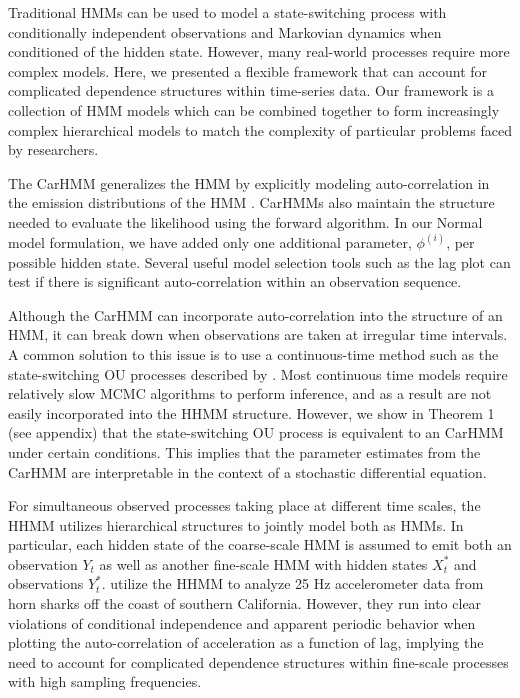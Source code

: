 

Traditional HMMs can be used to model a state-switching process with conditionally independent observations and Markovian dynamics when conditioned of the hidden state. However, many real-world processes require more complex models. Here, we presented a flexible framework that can account for complicated dependence structures within time-series data. Our framework is a collection of HMM models which can be combined together to form increasingly complex hierarchical models to match the complexity of particular problems faced by researchers.

The CarHMM generalizes the HMM by explicitly modeling auto-correlation in the emission distributions of the HMM \citep{Lawler:2019}. CarHMMs also maintain the structure needed to evaluate the likelihood using the forward algorithm. In our Normal model formulation, we have added only one additional parameter, $\phi^{(i)}$, per possible hidden state. Several useful model selection tools such as the lag plot can test if there is significant auto-correlation within an observation sequence.

Although the CarHMM can incorporate auto-correlation into the structure of an HMM, it can break down when observations are taken at irregular time intervals. A common solution to this issue is to use a continuous-time method such as the state-switching OU processes described by \citet{Michelot:2019}. Most continuous time models require relatively slow MCMC algorithms to perform inference, and as a result are not easily incorporated into the HHMM structure. However, we show in Theorem 1 (see appendix) that the state-switching OU process is equivalent to an CarHMM under certain conditions. This implies that the parameter estimates from the CarHMM are interpretable in the context of a stochastic differential equation.

For simultaneous observed processes taking place at different time scales, the HHMM \citep{Barajas:2017,Adam:2019} utilizes hierarchical structures to jointly model both as HMMs. In particular, each hidden state of the coarse-scale HMM is assumed to emit both an observation $Y_t$ as well as another fine-scale HMM with hidden states $X^*_t$ and observations $Y^*_t$. \citet{Adam:2019} utilize the HHMM to analyze 25 Hz accelerometer data from horn sharks off the coast of southern California. However, they run into clear violations of conditional independence and apparent periodic behavior when plotting the auto-correlation of acceleration as a function of lag, implying the need to account for complicated dependence structures within fine-scale processes with high sampling frequencies.

